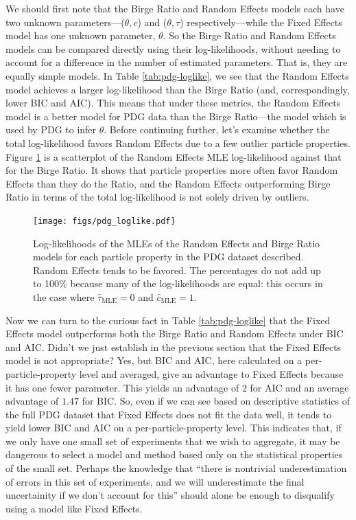 \documentclass[12pt]{article}
\begin{document}
We should first note that the Birge Ratio and Random Effects models each have two unknown parameters---($\theta,c$) and ($\theta,\tau$) respectively---while the Fixed Effects model has one unknown parameter, $\theta$. So the Birge Ratio and Random Effects models can be compared directly using their log-likelihoods, without needing to account for a difference in the number of estimated parameters. That is, they are equally simple models. In Table \ref{tab:pdg-loglike}, we see that the Random Effects model achieves a larger log-likelihood than the Birge Ratio (and, correspondingly, lower BIC and AIC). This means that under these metrics, the Random Effects model is a better model for PDG data than the Birge Ratio---the model which is used by PDG to infer $\theta$. Before continuing further, let's examine whether the total log-likelihood favors Random Effects due to a few outlier particle properties. Figure \ref{fig:pdg-loglike} is a scatterplot of the Random Effects MLE log-likelihood against that for the Birge Ratio. It shows that particle properties more often favor Random Effects than they do the Ratio, and the Random Effects outperforming Birge Ratio in terms of the total log-likelihood is not solely driven by outliers.

\begin{figure}
  \centering
  \texttt{[image: figs/pdg\_loglike.pdf]}
  \caption{Log-likelihoods of the MLEs of the Random Effects and Birge Ratio models for each particle property in the PDG dataset described. Random Effects tends to be favored. The percentages do not add up to 100\% because many of the log-likelihoods are equal: this occurs in the case where $\hat\tau_{\mathrm{MLE}}=0$ and $\hat{c}_{\mathrm{MLE}}=1$.}
  \label{fig:pdg-loglike}
\end{figure}

Now we can turn to the curious fact in Table \ref{tab:pdg-loglike} that the Fixed Effects model outperforms both the Birge Ratio and Random Effects under BIC and AIC. Didn't we just establish in the previous section that the Fixed Effects model is not appropriate? Yes, but BIC and AIC, here calculated on a per-particle-property level and averaged, give an advantage to Fixed Effects because it has one fewer parameter. This yields an advantage of $2$ for AIC and an average advantage of $1.47$ for BIC. So, even if we can see based on descriptive statistics of the full PDG dataset that Fixed Effects does not fit the data well, it tends to yield lower BIC and AIC on a per-particle-property level. This indicates that, if we only have one small set of experiments that we wish to aggregate, it may be dangerous to select a model and method based only on the statistical properties of the small set. Perhaps the knowledge that ``there is nontrivial underestimation of errors in this set of experiments, and we will underestimate the final uncertainity if we don't account for this'' should alone be enough to disqualify using a model like Fixed Effects.
\end{document}
